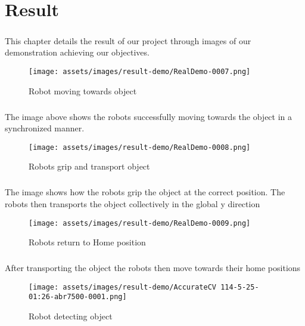 \chapter{Result}
\paragraph*{}
This chapter details the result of our project through images of our demonstration achieving our objectives.

\begin{figure}[H]
    \centering
    \texttt{[image: assets/images/result-demo/RealDemo-0007.png]}
    \caption{Robot moving towards object}
    \label{fig:detail-result}
\end{figure}

\paragraph*{}
The image above shows the robots successfully moving towards the object in a synchronized manner.

\begin{figure}[H]
    \centering
    \texttt{[image: assets/images/result-demo/RealDemo-0008.png]}
    \caption{Robots grip and transport object}
    \label{fig:detail-result}
\end{figure}

\paragraph*{}
The image shows how the robots grip the object at the correct position. The robots then transports the object collectively in the global y direction

\begin{figure}[H]
    \centering
    \texttt{[image: assets/images/result-demo/RealDemo-0009.png]}
    \caption{Robots return to Home position}
    \label{fig:detail-result}
\end{figure}

\paragraph*{}
After transporting the object the robots then move towards their home positions

\begin{figure}[H]
    \centering
    \texttt{[image: assets/images/result-demo/AccurateCV 114-5-25-01:26-abr7500-0001.png]}
    \caption{Robot detecting object}
    \label{fig:detail-result}
\end{figure}

